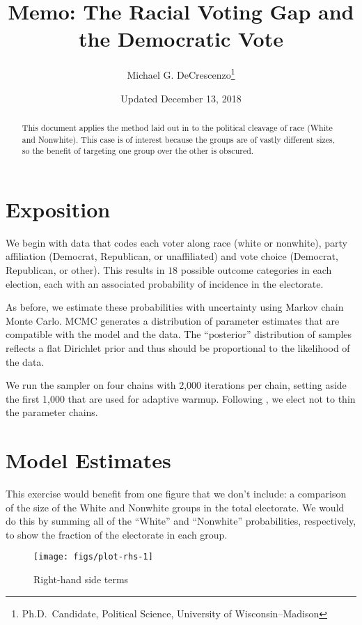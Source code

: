 \documentclass[12pt,]{article}
\title{Memo: The Racial Voting Gap and the Democratic Vote}
\author{Michael G. DeCrescenzo\footnote{Ph.D.~Candidate, Political Science,
  University of Wisconsin--Madison}}
\date{Updated December 13, 2018}
\theoremstyle{definition}
\theoremstyle{definition}
\theoremstyle{definition}
\theoremstyle{remark}
\begin{document}
\maketitle
\begin{abstract}
This document applies the method laid out in
\textcite{burden-decrescenzo-gap} to the political cleavage of race
(White and Nonwhite). This case is of interest because the groups are of
vastly different sizes, so the benefit of targeting one group over the
other is obscured.
\end{abstract}

\hypertarget{exposition}{%
\section{Exposition}\label{exposition}}

We begin with data that codes each voter along race (white or nonwhite),
party affiliation (Democrat, Republican, or unaffiliated) and vote
choice (Democrat, Republican, or other). This results in \(18\) possible
outcome categories in each election, each with an associated probability
of incidence in the electorate.

As before, we estimate these probabilities with uncertainty using Markov
chain Monte Carlo. MCMC generates a distribution of parameter estimates
that are compatible with the model and the data. The ``posterior''
distribution of samples reflects a flat Dirichlet prior and thus should
be proportional to the likelihood of the data.

We run the sampler on four chains with 2,000 iterations per chain,
setting aside the first 1,000 that are used for adaptive warmup.
Following \textcite{Link2011}, we elect not to thin the parameter
chains.

\hypertarget{model-estimates}{%
\section{Model Estimates}\label{model-estimates}}

This exercise would benefit from one figure that we don't include: a
comparison of the size of the White and Nonwhite groups in the total
electorate. We would do this by summing all of the ``White'' and
``Nonwhite'' probabilities, respectively, to show the fraction of the
electorate in each group.

\begin{figure}

{\centering \texttt{[image: figs/plot-rhs-1]} 

}

\caption{Right-hand side terms}\label{fig:plot-rhs}
\end{figure}
\end{document}
